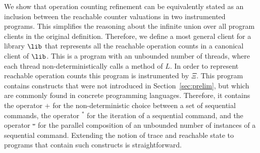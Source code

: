 We show that operation counting refinement can be equivalently stated as an inclusion between the reachable counter valuations in two instrumented programs. 
This simplifies the reasoning about the infinite union over all program clients in the original definition. %
Therefore, %
we define a most general client for a library $\lib$ that represents all the reachable operation counts in a canonical client of $\lib$.
This is a program with an unbounded number of threads, where each thread non-deterministically calls a method of $L$. In order
to represent reachable operation counts this program is instrumented by $\Xi$. 
This program contains constructs that were not introduced in Section~\ref{sec:prelim}, but which 
are commonly found in concrete programming languages. Therefore, it contains the operator $+$ for the non-deterministic choice 
between a set of sequential commands, the operator $^*$ for the iteration of a sequential command, and the operator 
$^{\shuffle}$ for the parallel composition of an unbounded number of instances of a sequential command. Extending
the notion of trace and reachable state to programs that contain such constructs is straightforward. 

